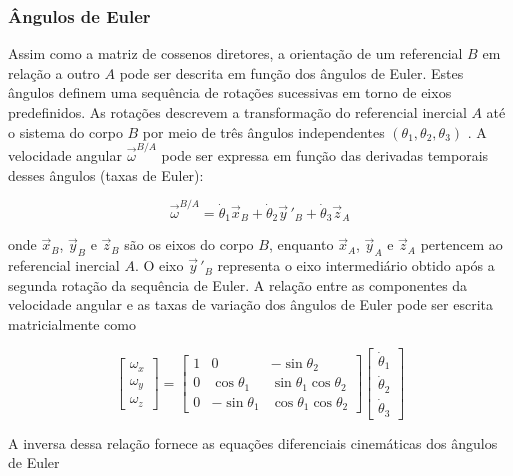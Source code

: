 \subsubsection{Ângulos de Euler}
\label{sec:angulos_euler}

Assim como a matriz de cossenos diretores, a orientação de um referencial $B$ em relação a outro $A$ pode ser descrita em função dos ângulos de Euler.
Estes ângulos definem uma sequência de rotações sucessivas em torno de eixos predefinidos.
As rotações descrevem a transformação do referencial inercial $A$ até o sistema do corpo $B$ por meio de três ângulos independentes $(\theta_1, \theta_2, \theta_3)$ \cite{wie2008space}.
A velocidade angular $\vec{\omega}^{B/A}$ pode ser expressa em função das derivadas temporais desses ângulos (taxas de Euler):

\begin{equation}
\vec{\omega}^{B/A} =
\dot{\theta}_1 \vec{x}_B +
\dot{\theta}_2 \vec{y}\,'_B +
\dot{\theta}_3 \vec{z}_A
\end{equation}

onde $\vec{x}_B$, $\vec{y}_B$ e $\vec{z}_B$ são os eixos do corpo $B$, enquanto $\vec{x}_A$, $\vec{y}_A$ e $\vec{z}_A$ pertencem ao referencial inercial $A$.
O eixo $\vec{y}\,'_B$ representa o eixo intermediário obtido após a segunda rotação da sequência de Euler.
A relação entre as componentes da velocidade angular e as taxas de variação dos ângulos de Euler pode ser escrita matricialmente como

\begin{equation}
\begin{bmatrix}
\omega_x \\ \omega_y \\ \omega_z
\end{bmatrix}
=
\begin{bmatrix}
1 & 0 & -\sin\theta_2 \\
0 & \cos\theta_1 & \sin\theta_1 \cos\theta_2 \\
0 & -\sin\theta_1 & \cos\theta_1 \cos\theta_2
\end{bmatrix}
\begin{bmatrix}
\dot{\theta}_1 \\ \dot{\theta}_2 \\ \dot{\theta}_3
\end{bmatrix}
\label{eq:cinematica_euler}
\end{equation}

A inversa dessa relação fornece as equações diferenciais cinemáticas dos ângulos de Euler

